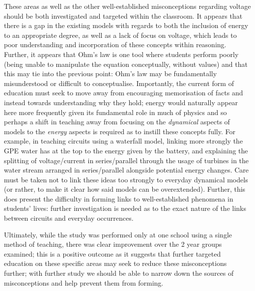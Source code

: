 \documentclass[a4paper,openany,nobib]{tufte-book}
\begin{document}
These areas as well as the other well-established misconceptions regarding voltage should be both investigated and targeted within the classroom. It appears that there is a gap in the existing models with regards to both the inclusion of energy to an appropriate degree, as well as a lack of focus on voltage, which leads to poor understanding and incorporation of these concepts within reasoning. Further, it appears that Ohm's law is one tool where students perform poorly (being unable to manipulate the equation conceptually, without values) and that this may tie into the previous point: Ohm's law may be fundamentally misunderstood or difficult to conceptualise.
Importantly, the current form of education must seek to move away from encouraging memorisation of facts and instead towards understanding why they hold; energy would naturally appear here more frequently given its fundamental role in much of physics and so perhaps a shift in teaching away from focusing on the \emph{dynamical} aspects of models to the \emph{energy} aspects is required as to instill these concepts fully. For example, in teaching circuits using a waterfall model, linking more strongly the GPE water has at the top to the energy given by the battery, and explaining the splitting of voltage/current in series/parallel through the usage of turbines in the water stream arranged in series/parallel alongside potential energy changes. Care must be taken not to link these ideas too strongly to everyday dynamical models (or rather, to make it clear how said models can be overextended).
Further, this does present the difficulty in forming links to well-established phenomena in students' lives: further investigation is needed as to the exact nature of the links between circuits and everyday occurrences.

Ultimately, while the study was performed only at one school using a single method of teaching, there was clear improvement over the 2 year groups examined; this is a positive outcome as it suggests that further targeted education on these specific areas may seek to reduce these misconceptions further; with further study we should be able to narrow down the sources of misconceptions and help prevent them from forming.
\backmatter
\nocite{*}
\printbibliography[heading=bibintoc]
\end{document}
